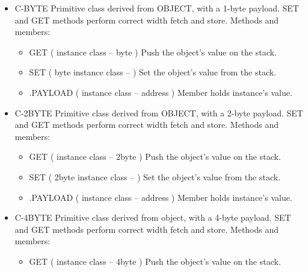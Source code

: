 \begin{;stlisting}[frame=single]
\begin{itemize}[noitemsep]
\begin{itemize}[noitemsep]
		\item .CLASS ( instance class -- a-address )\newline
		Cell member that holds the class.
	\end{itemize}

	\item C-BYTE\newline
	Primitive class derived from OBJECT, with a 1-byte payload. SET
	and GET methods perform correct width fetch and store. Methods
	and members:
	\begin{itemize}[noitemsep]
		\item GET ( instance class -- byte )\newline
		Push the object's value on the stack.

		\item SET ( byte instance class -- )\newline
		Set the object's value from the stack.

		\item .PAYLOAD ( instance class -- address )\newline
		Member holds instance's value.
	\end{itemize}

	\item C-2BYTE\newline
	Primitive class derived from OBJECT, with a 2-byte payload. SET
	and GET methods perform correct width fetch and store. Methods
	and members:
	\begin{itemize}[noitemsep]
		\item GET ( instance class -- 2byte )\newline
		Push the object's value on the stack.

		\item SET ( 2byte instance class -- )\newline
		Set the object's value from the stack.

		\item .PAYLOAD ( instance class -- address )\newline
		Member holds instance's value.
	\end{itemize}

	\item C-4BYTE\newline
	Primitive class derived from object, with a 4-byte payload. SET
	and GET methods perform correct width fetch and store. Methods
	and members:
	\begin{itemize}[noitemsep]
		\item GET ( instance class -- 4byte )\newline
		Push the object's value on the stack.


\end{itemize}
\end{itemize}
\end{;stlisting}
